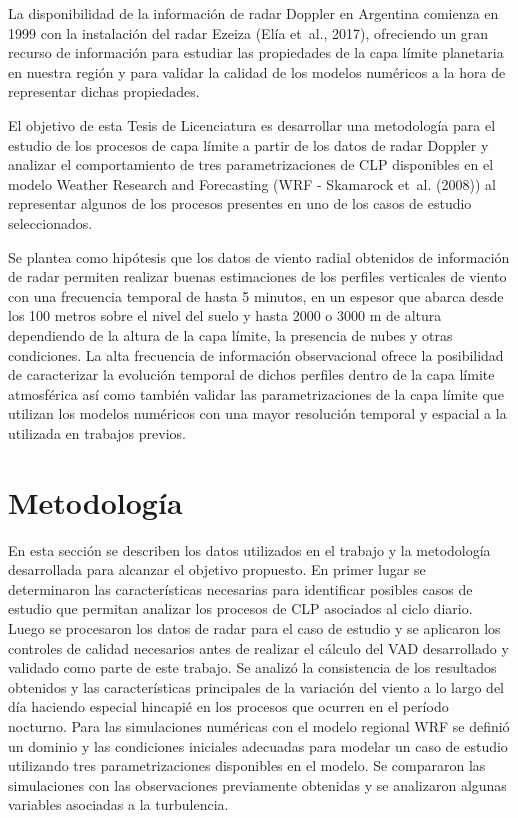 \documentclass[12pt,spanish,oneside, a4paper]{book}
\begin{document}
La disponibilidad de la información de radar Doppler en Argentina
comienza en 1999 con la instalación del radar Ezeiza (Elía et~al.,
2017), ofreciendo un gran recurso de información para estudiar las
propiedades de la capa límite planetaria en nuestra región y para
validar la calidad de los modelos numéricos a la hora de representar
dichas propiedades.

El objetivo de esta Tesis de Licenciatura es desarrollar una metodología
para el estudio de los procesos de capa límite a partir de los datos de
radar Doppler y analizar el comportamiento de tres parametrizaciones de
CLP disponibles en el modelo Weather Research and Forecasting (WRF -
Skamarock et~al. (2008)) al representar algunos de los procesos
presentes en uno de los casos de estudio seleccionados.

Se plantea como hipótesis que los datos de viento radial obtenidos de
información de radar permiten realizar buenas estimaciones de los
perfiles verticales de viento con una frecuencia temporal de hasta 5
minutos, en un espesor que abarca desde los 100 metros sobre el nivel
del suelo y hasta 2000 o 3000 m de altura dependiendo de la altura de la
capa límite, la presencia de nubes y otras condiciones. La alta
frecuencia de información observacional ofrece la posibilidad de
caracterizar la evolución temporal de dichos perfiles dentro de la capa
límite atmosférica así como también validar las parametrizaciones de la
capa límite que utilizan los modelos numéricos con una mayor resolución
temporal y espacial a la utilizada en trabajos previos.

\chapter{Metodología}\label{metodologia}

En esta sección se describen los datos utilizados en el trabajo y la
metodología desarrollada para alcanzar el objetivo propuesto. En primer
lugar se determinaron las características necesarias para identificar
posibles casos de estudio que permitan analizar los procesos de CLP
asociados al ciclo diario. Luego se procesaron los datos de radar para
el caso de estudio y se aplicaron los controles de calidad necesarios
antes de realizar el cálculo del VAD desarrollado y validado como parte
de este trabajo. Se analizó la consistencia de los resultados obtenidos
y las características principales de la variación del viento a lo largo
del día haciendo especial hincapié en los procesos que ocurren en el
período nocturno. Para las simulaciones numéricas con el modelo regional
WRF se definió un dominio y las condiciones iniciales adecuadas para
modelar un caso de estudio utilizando tres parametrizaciones disponibles
en el modelo. Se compararon las simulaciones con las observaciones
previamente obtenidas y se analizaron algunas variables asociadas a la
turbulencia.
\end{document}
